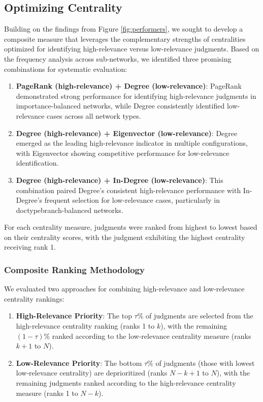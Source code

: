 \subsection{Optimizing Centrality}

Building on the findings from Figure \ref{fig:performers}, we sought to develop a composite measure that leverages the complementary strengths of centralities optimized for identifying high-relevance versus low-relevance judgments. Based on the frequency analysis across sub-networks, we identified three promising combinations for systematic evaluation:

\begin{enumerate}
\item \textbf{PageRank (high-relevance) + Degree (low-relevance)}: PageRank demonstrated strong performance for identifying high-relevance judgments in importance-balanced networks, while Degree consistently identified low-relevance cases across all network types.

\item \textbf{Degree (high-relevance) + Eigenvector (low-relevance)}: Degree emerged as the leading high-relevance indicator in multiple configurations, with Eigenvector showing competitive performance for low-relevance identification.

\item \textbf{Degree (high-relevance) + In-Degree (low-relevance)}: This combination paired Degree's consistent high-relevance performance with In-Degree's frequent selection for low-relevance cases, particularly in doctypebranch-balanced networks.
\end{enumerate}

For each centrality measure, judgments were ranked from highest to lowest based on their centrality scores, with the judgment exhibiting the highest centrality receiving rank 1.

\subsubsection{Composite Ranking Methodology}

We evaluated two approaches for combining high-relevance and low-relevance centrality rankings:

\begin{enumerate}
\item \textbf{High-Relevance Priority}: The top $\tau\%$ of judgments are selected from the high-relevance centrality ranking (ranks 1 to $k$), with the remaining $(1-\tau)\%$ ranked according to the low-relevance centrality measure (ranks $k+1$ to $N$).

\item \textbf{Low-Relevance Priority}: The bottom $\tau\%$ of judgments (those with lowest low-relevance centrality) are deprioritized (ranks $N-k+1$ to $N$), with the remaining judgments ranked according to the high-relevance centrality measure (ranks 1 to $N-k$).
\end{enumerate}

